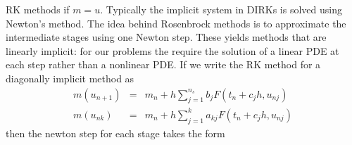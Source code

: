 \documentclass[10pt,dvips,twoside,reqno]{amsart}
\begin{document}
RK methods if $m=u$. Typically the implicit system in DIRKs is solved
using Newton's method. The idea behind Rosenbrock methods is to
approximate the intermediate stages using one Newton step. These
yields methods that are linearly implicit: for our problems the
require the solution of a linear PDE at each step rather than a
nonlinear PDE. If we write the RK method for a diagonally implicit
method as
\begin{eqnarray}
  \label{eq:rungeKutta}
  m(u_{n+1}) &=& m_n + h \sum_{j=1}^{n_s} b_j F(t_n + c_j h,u_{nj}) \\
  m(u_{nk})  &=& m_n + h \sum_{j=1}^{k} a_{kj} F(t_n + c_j h,u_{nj}) 
\end{eqnarray}
then the newton step for each stage takes the form

 
\end{document}
